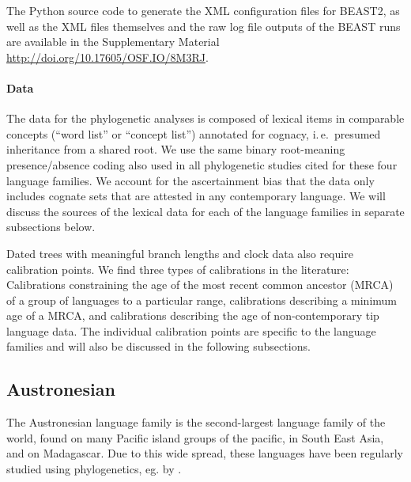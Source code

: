 \documentclass[]{rsos}%
\begin{document}
The Python source code to generate the XML configuration files for BEAST2, as well as
the XML files themselves and the raw log file outputs of the BEAST runs are
available in the Supplementary Material \url{http://doi.org/10.17605/OSF.IO/8M3RJ}.


\paragraph{Data}

The data for the phylogenetic analyses is composed of lexical items in comparable concepts (“word list” or “concept list”) annotated
for cognacy, i.\,e.\ presumed inheritance from a shared root.
We use the same binary root-meaning presence/absence coding also used in all
phylogenetic studies cited for these four language families.
We account for the ascertainment bias that the data
only includes cognate sets that are attested in any contemporary language.
We will discuss the sources of the lexical data for each of the language families in separate subsections below.

Dated trees with meaningful branch lengths and clock data also require calibration points.
We find three types of calibrations in the literature: Calibrations constraining the age of the most recent common ancestor (MRCA) of a group of languages to a particular range, calibrations describing a minimum age of a MRCA, and calibrations describing the age of non-contemporary tip language data.
The individual calibration points are specific to the language families and will also be discussed in the following subsections.



\subsection{Austronesian}\label{s:austronesian}

The Austronesian language family is the second-largest language family of the world, found on many Pacific island groups of the pacific, in South East Asia, and on Madagascar.
Due to this wide spread, these languages have been regularly studied using phylogenetics, eg. by
\textcite{gray2009language,greenhill2017evolutionary,greenhill2018population}.
\end{document}
